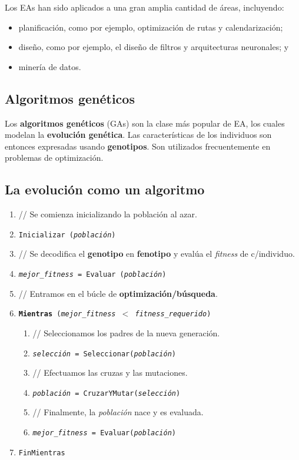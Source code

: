 \documentclass[10pt,a4paper]{article}
\begin{document}
Los EAs han sido aplicados a una gran amplia cantidad de áreas, incluyendo:
\begin{itemize}
\item planificación, como por ejemplo, optimización de rutas y calendarización;
\item diseño, como por ejemplo, el diseño de filtros y arquitecturas neuronales; y
\item minería de datos.
\end{itemize}

\subsection{Algoritmos genéticos}

Los \textbf{algoritmos genéticos} (GAs) son la clase más popular de EA, los cuales modelan la \textbf{evolución genética}. Las características de los individuos son entonces expresadas usando \textbf{genotipos}. Son utilizados frecuentemente en problemas de optimización.

\subsection{La evolución como un algoritmo}

\begin{enumerate}
\item[] {\color{darkgray} // Se comienza inicializando la población al azar.}
\item \texttt{Inicializar (\textit{población})}
\item[] {\color{darkgray} // Se decodifica el \textbf{genotipo} en \textbf{fenotipo} y evalúa el \textit{fitness} de c/individuo.}
\item \texttt{\textit{mejor\_fitness} = Evaluar (\textit{población})}
\item[] {\color{darkgray} // Entramos en el búcle de \textbf{optimización/búsqueda}.}
\item \texttt{\textbf{Mientras} (\textit{mejor\_fitness} $<$ \textit{fitness\_requerido})}
\begin{enumerate}[3.1]
\item[] {\color{darkgray} // Seleccionamos los padres de la nueva generación.}
\item \texttt{\textit{selección} = Seleccionar(\textit{población})}
\item[] {\color{darkgray} // Efectuamos las cruzas y las mutaciones.}
\item \texttt{\textit{población} = CruzarYMutar(\textit{selección})}
\item[] {\color{darkgray} // Finalmente, la \textit{población} nace y es evaluada.}
\item \texttt{\textit{mejor\_fitness} = Evaluar(\textit{población})}
\end{enumerate}
\item \texttt{FinMientras}
\end{enumerate}
\end{document}
